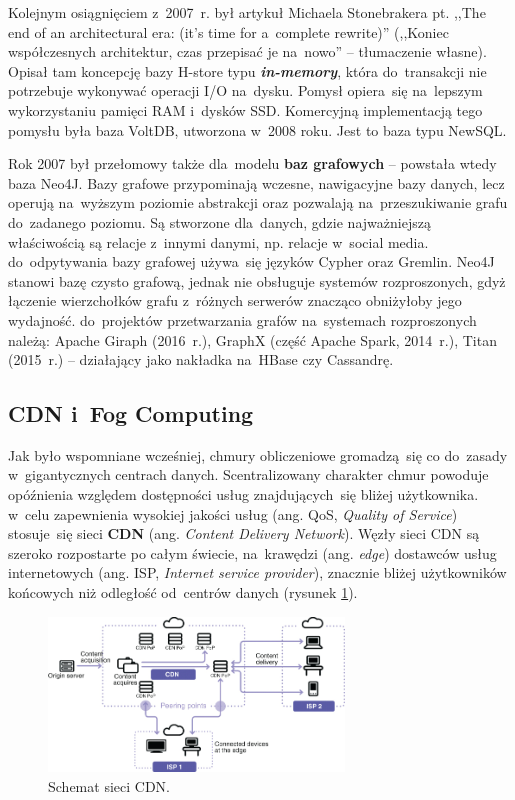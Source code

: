\documentclass[12pt,a4paper,twoside,titlepage,openright]{book}
\begin{document}
Kolejnym osiągnięciem z~2007~r. był artykuł Michaela Stonebrakera pt. ,,The end of an architectural era: (it's time for a~complete rewrite)'' (,,Koniec współczesnych architektur, czas przepisać je na~nowo'' -- tłumaczenie własne). Opisał tam koncepcję bazy H-store typu \textit{\textbf{in-memory}}, która do~transakcji nie potrzebuje wykonywać operacji I/O na~dysku. Pomysł opiera~się na~lepszym wykorzystaniu pamięci RAM i~dysków SSD. Komercyjną implementacją tego pomysłu była baza VoltDB, utworzona w~2008 roku. Jest to baza typu NewSQL.

Rok 2007 był przełomowy także dla~modelu \textbf{baz grafowych} -- powstała wtedy baza Neo4J. Bazy grafowe przypominają wczesne, nawigacyjne bazy danych, lecz operują na~wyższym poziomie abstrakcji oraz pozwalają na~przeszukiwanie grafu do~zadanego poziomu. Są stworzone dla~danych, gdzie najważniejszą właściwością są relacje z~innymi danymi, np. relacje w~social media. do~odpytywania bazy grafowej używa~się języków Cypher oraz Gremlin. Neo4J stanowi bazę czysto grafową, jednak nie obsługuje systemów rozproszonych, gdyż łączenie wierzchołków grafu z~różnych serwerów znacząco obniżyłoby jego wydajność. do~projektów przetwarzania grafów na~systemach rozproszonych należą: Apache Giraph (2016~r.), GraphX (część Apache Spark, 2014~r.), Titan (2015~r.) -- działający jako nakładka na~HBase czy Cassandrę.


\subsection{CDN i~Fog Computing} \label{section:fog}

Jak było wspomniane wcześniej, chmury obliczeniowe gromadzą~się co do~zasady w~gigantycznych centrach danych. Scentralizowany charakter chmur powoduje opóźnienia względem dostępności usług znajdujących~się bliżej użytkownika. w~celu zapewnienia wysokiej jakości usług (ang. QoS, \textit{Quality of Service}) stosuje~się sieci \textbf{CDN} (ang. \textit{Content Delivery Network}). Węzły sieci CDN są szeroko rozpostarte po całym świecie, na~krawędzi (ang. \textit{edge}) dostawców usług internetowych (ang. ISP, \textit{Internet service provider}), znacznie bliżej użytkowników końcowych niż odległość od~centrów danych (rysunek \ref{fig:cdn-schemat}). \cite{cdn}

\begin{figure}[h]
	\centering
			\includegraphics[width=0.7\textwidth]{cdn-schemat.jpg}
		\caption{Schemat sieci CDN. \cite{cdn}}
		\label{fig:cdn-schemat}
\end{figure}
\end{document}
